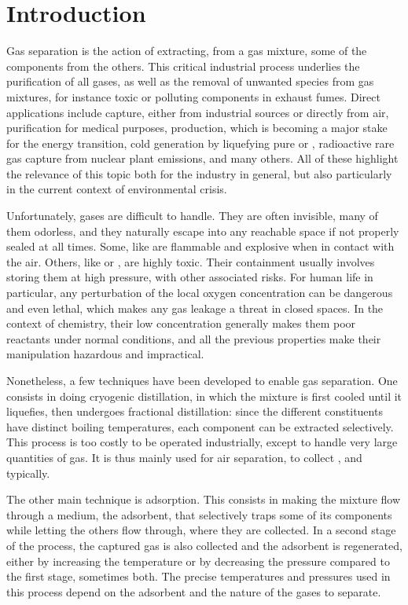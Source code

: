 
\chapter*{Introduction}

Gas separation is the action of extracting, from a gas mixture, some of the components from the others. This critical industrial process underlies the purification of all gases, as well as the removal of unwanted species from gas mixtures, for instance toxic or polluting components in exhaust fumes. Direct applications include  capture, either from industrial sources or directly from air,  purification for medical purposes,  production, which is becoming a major stake for the energy transition, cold generation by liquefying pure  or , radioactive rare gas capture from nuclear plant emissions, and many others. All of these highlight the relevance of this topic both for the industry in general, but also particularly in the current context of environmental crisis.

Unfortunately, gases are difficult to handle. They are often invisible, many of them odorless, and they naturally escape into any reachable space if not properly sealed at all times. Some, like  are flammable and explosive when in contact with the air. Others, like  or , are highly toxic. Their containment usually involves storing them at high pressure, with other associated risks. For human life in particular, any perturbation of the local oxygen concentration can be dangerous and even lethal, which makes any gas leakage a threat in closed spaces. In the context of chemistry, their low concentration generally makes them poor reactants under normal conditions, and all the previous properties make their manipulation hazardous and impractical.

Nonetheless, a few techniques have been developed to enable gas separation. One consists in doing cryogenic distillation, in which the mixture is first cooled until it liquefies, then undergoes fractional distillation: since the different constituents have distinct boiling temperatures, each component can be extracted selectively. This process is too costly to be operated industrially, except to handle very large quantities of gas. It is thus mainly used for air separation, to collect ,  and  typically.

The other main technique is adsorption. This consists in making the mixture flow through a medium, the adsorbent, that selectively traps some of its components while letting the others flow through, where they are collected. In a second stage of the process, the captured gas is also collected and the adsorbent is regenerated, either by increasing the temperature or by decreasing the pressure compared to the first stage, sometimes both. The precise temperatures and pressures used in this process depend on the adsorbent and the nature of the gases to separate.

